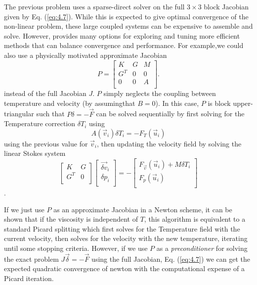 The previous problem uses a sparse-direct solver on the full
$3\times3$ block Jacobian given by Eq. (\ref{eq:4.7}).  While this is
expected to give optimal convergence of the non-linear problem, these
large coupled systems can be expensive to assemble and solve. However,
\TF{} provides many options for exploring and tuning more efficient
methods that can balance convergence and performance.  For example,we
could also use a physically motivated approximate Jacobian
\begin{equation}
  \label{eq:4.9}
   P = \left[
\begin{array}{ccc}
  K & G  & M \\
  G^{T} & 0 & 0 \\
  0 & 0 & A \\ 
  \end{array}
  \right].
\end{equation}
instead of the full Jacobian $J$. $P$ simply neglects the coupling between temperature and velocity
(by  assumingthat $B=0$).  In this case, $P$ is block
upper-triangular such that $P\delta = -\vec{F}$  can be solved
sequentially by first solving for the Temperature correction $\delta
T_{i}$ using
\begin{equation}
  \label{eq:4.14}
  A(\vec{v}_i)\delta T_i = -F_{T}(\vec{u}_i)
\end{equation}
using the previous value for $\vec{v}_i$, then updating the velocity field by solving the linear
Stokes system
\begin{equation}
  \label{eq:4.8}
   \left[
\begin{array}{cc}
  K & G  \\
  G^{T} & 0 \\
  \end{array}
  \right]
  \left[
    \begin{array}{c}
      \vec{\delta v}_i \\
      \delta p_i \\
    \end{array}
  \right] = -\left[
    \begin{array}{c}
      F_{\vec{v}}(\vec{u}_{i}) + M\delta T_{i}\\
      F_p(\vec{u}_{i})\\
    \end{array}
  \right]
\end{equation} .


If we just use $P$ as an approximate Jacobian in a Newton scheme, it
can be shown that if the  viscosity is independent of $T$, this
algorithm is equivalent to a standard Picard splitting which first
solves for the  Temperature field with the current velocity,  then
solves for the velocity with the new temperature,  iterating until
some stopping criteria. However,  if we use $P$ as a
\emph{preconditioner} for solving the exact problem
$J\vec{\delta}=-\vec{F}$ using the full Jacobian,
Eq. (\ref{eq:4.7})  we can  get the expected quadratic
convergence of newton with the computational expense of a Picard
iteration.

